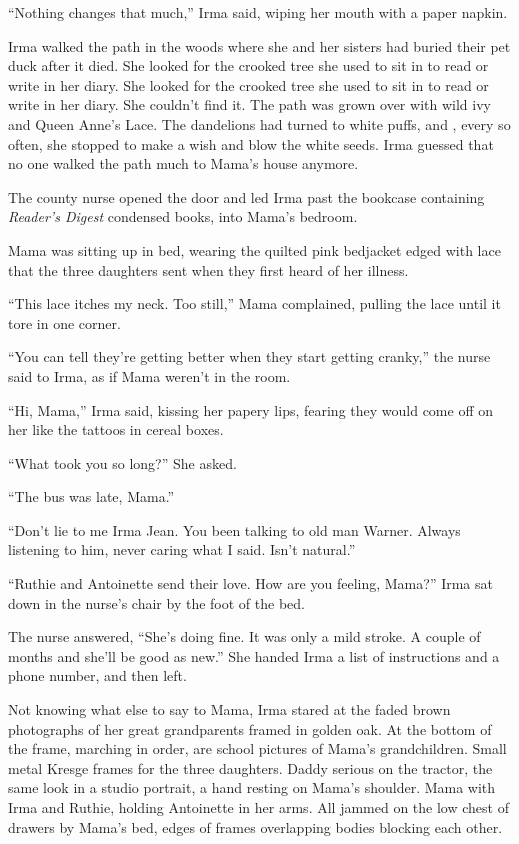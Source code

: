 \documentclass[twoside,10pt]{book}
\begin{document}
``Nothing changes that much,'' Irma said, wiping her mouth with a paper
napkin.

Irma walked the path in the woods where she and her sisters had buried
their pet duck after it died. She looked for the crooked tree she used
to sit in to read or write in her diary. She looked for the crooked tree
she used to sit in to read or write in her diary. She couldn't find it.
The path was grown over with wild ivy and Queen Anne's Lace. The
dandelions had turned to white puffs, and , every so often, she stopped
to make a wish and blow the white seeds. Irma guessed that no one walked
the path much to Mama's house anymore.

The county nurse opened the door and led Irma past the bookcase
containing \emph{Reader's Digest} condensed books, into Mama's bedroom.

Mama was sitting up in bed, wearing the quilted pink bedjacket edged
with lace that the three daughters sent when they first heard of her
illness.

``This lace itches my neck. Too still,'' Mama complained, pulling the
lace until it tore in one corner.

``You can tell they're getting better when they start getting cranky,''
the nurse said to Irma, as if Mama weren't in the room.

``Hi, Mama,'' Irma said, kissing her papery lips, fearing they would
come off on her like the tattoos in cereal boxes.

``What took you so long?'' She asked.

``The bus was late, Mama.''

``Don't lie to me Irma Jean. You been talking to old man Warner. Always
listening to him, never caring what I said. Isn't natural.''

``Ruthie and Antoinette send their love. How are you feeling, Mama?''
Irma sat down in the nurse's chair by the foot of the bed.

The nurse answered, ``She's doing fine. It was only a mild stroke. A
couple of months and she'll be good as new.'' She handed Irma a list of
instructions and a phone number, and then left.

Not knowing what else to say to Mama, Irma stared at the faded brown
photographs of her great grandparents framed in golden oak. At the
bottom of the frame, marching in order, are school pictures of Mama's
grandchildren. Small metal Kresge frames for the three daughters. Daddy
serious on the tractor, the same look in a studio portrait, a hand
resting on Mama's shoulder. Mama with Irma and Ruthie, holding
Antoinette in her arms. All jammed on the low chest of drawers by Mama's
bed, edges of frames overlapping bodies blocking each other.
\end{document}
